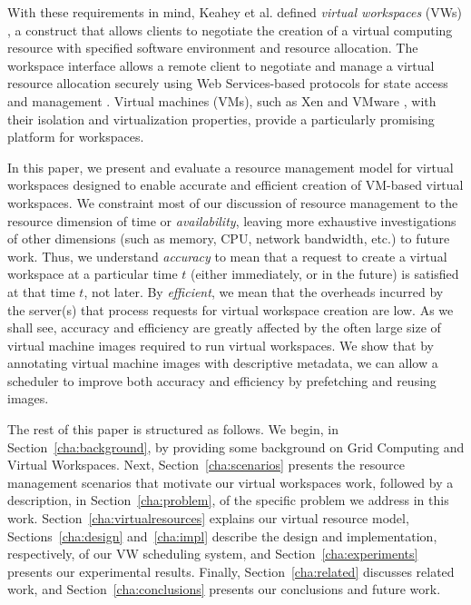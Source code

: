 With these requirements in mind, Keahey et al. defined \emph{virtual workspaces} (VWs) \cite{VirtualWorkspaces05}, a construct that allows clients to negotiate the creation of a virtual computing resource with specified software environment and resource allocation. The workspace interface allows a remote client to negotiate and manage a virtual resource allocation securely using Web Services{}-based protocols for state access and management \cite{ModelingState05}. Virtual machines (VMs), such as Xen \cite{xen} and VMware \cite{vmwareweb}, with their isolation and virtualization properties, provide a
particularly promising platform for workspaces.

In this paper, we present and evaluate a resource management model for virtual workspaces designed to enable accurate and efficient creation of VM{}-based virtual workspaces. We constraint most of our discussion of resource management to the resource dimension of time or \emph{availability}, leaving more exhaustive investigations of other dimensions (such as memory, CPU, network bandwidth, etc.) to future work. Thus, we understand \emph{accuracy} to mean that a request to create a virtual workspace at a particular time $t$ (either immediately, or in the future) is satisfied at that time $t$, not later. By \emph{efficient}, we mean that the overheads incurred by the server(s) that process requests for virtual workspace creation are low. As we shall see, accuracy and efficiency are greatly affected by the often large size of virtual machine images required to run virtual workspaces. We show that by annotating virtual machine images with descriptive metadata, we can allow a scheduler to improve both accuracy and efficiency by prefetching and reusing images.

The rest of this paper is structured as follows. We begin, in Section~\ref{cha:background}, by providing some background on Grid Computing and Virtual Workspaces. Next, Section~\ref{cha:scenarios} presents the resource management scenarios
that motivate our virtual workspaces work, followed by a description, in Section~\ref{cha:problem}, of the specific problem we address in this work. Section~\ref{cha:virtualresources} explains our virtual resource model, Sections~\ref{cha:design}  and~\ref{cha:impl} describe the design and implementation, respectively, of our VW scheduling system, and Section~\ref{cha:experiments} presents our experimental results. Finally, Section~\ref{cha:related} discusses related work, and Section~\ref{cha:conclusions} presents our conclusions and future work.
